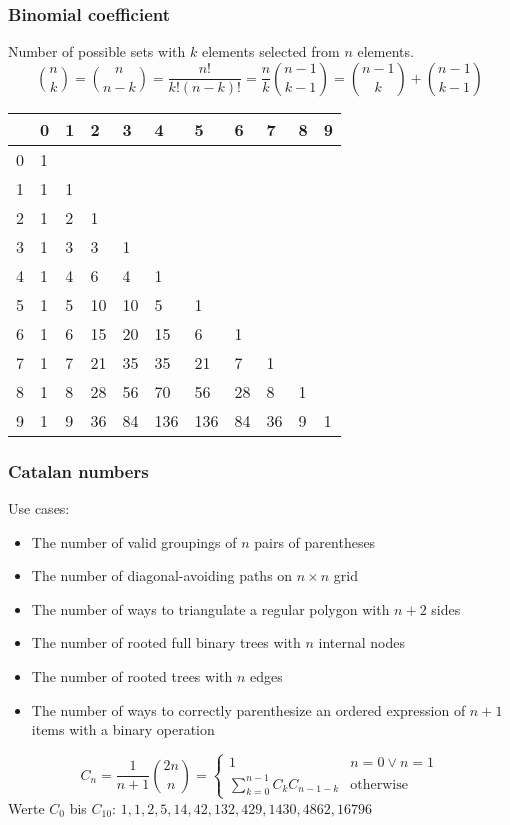 \subsubsection{Binomial coefficient}
Number of possible sets with $k$ elements selected from $n$ elements. 
\begin{equation*}
  \binom{n}{k} = \binom{n}{n - k} = \frac{n!}{k!(n - k)!} =
  \frac{n}{k}\binom{n - 1}{k - 1} = \binom{n - 1}{k} + \binom{n - 1}{k
  - 1}
\end{equation*}
\begin{center}
	\begin{tabular}{ |l||l|l|l|l|l|l|l|l|l|l| } 
		\hline
		\diagbox{$n$}{$k$} & 0 & 1 & 2 & 3 & 4 & 5 & 6 & 7 & 8 & 9\\
		\hline\hline
		0 &  1 &   &    &    &     &     &    &    &  &  \\
		1 &  1 & 1 &    &    &     &     &    &    &  &  \\
		2 &  1 & 2 & 1  &    &     &     &    &    &  &  \\
		3 &  1 & 3 & 3  & 1  &     &     &    &    &  &  \\
		4 &  1 & 4 & 6  & 4  & 1   &     &    &    &  &  \\
		5 &  1 & 5 & 10 & 10 & 5   & 1   &    &    &  &  \\
		6 &  1 & 6 & 15 & 20 & 15  & 6   & 1  &    &  &  \\
		7 &  1 & 7 & 21 & 35 & 35  & 21  & 7  & 1  &  &  \\
		8 &  1 & 8 & 28 & 56 & 70  & 56  & 28 & 8  & 1&  \\
		9 &  1 & 9 & 36 & 84 & 136 & 136 & 84 & 36 & 9& 1\\
		\hline
	\end{tabular}
\end{center}
\subsubsection{Catalan numbers}
Use cases:
\begin{itemize}
\item The number of valid groupings of $n$ pairs of parentheses
\item The number of diagonal-avoiding paths on $n\times n$ grid
\item The number of ways to triangulate a regular polygon with $n + 2$
  sides
\item The number of rooted full binary trees with $n$ internal nodes
\item The number of rooted trees with $n$ edges
\item The number of ways to correctly parenthesize an ordered expression of $n
  + 1$ items with a binary operation
\end{itemize}
\begin{equation*}
  C_n = \frac{1}{n + 1}\binom{2n}{n} =
  \begin{cases}
    1 & n = 0 \lor n = 1\\
    \sum\limits_{k = 0}^{n - 1}C_kC_{n - 1 - k} & \text{otherwise}
  \end{cases}
\end{equation*}
Werte $C_0$ bis $C_{10}$: $1, 1, 2, 5, 14, 42, 132, 429, 1430, 4862, 16796$

